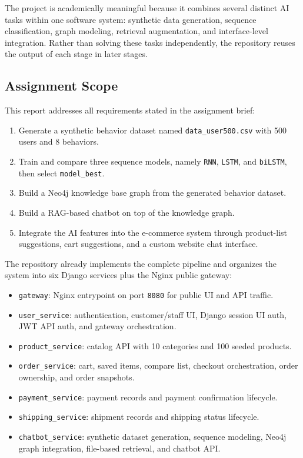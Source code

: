 \documentclass[12pt,a4paper]{article}
\begin{document}
The project is academically meaningful because it combines several distinct AI tasks within one software system: synthetic data generation, sequence classification, graph modeling, retrieval augmentation, and interface-level integration. Rather than solving these tasks independently, the repository reuses the output of each stage in later stages.

\subsection{Assignment Scope}
This report addresses all requirements stated in the assignment brief:
\begin{enumerate}[label=\arabic*.]
  \item Generate a synthetic behavior dataset named \texttt{data\_user500.csv} with 500 users and 8 behaviors.
  \item Train and compare three sequence models, namely \texttt{RNN}, \texttt{LSTM}, and \texttt{biLSTM}, then select \texttt{model\_best}.
  \item Build a Neo4j knowledge base graph from the generated behavior dataset.
  \item Build a RAG-based chatbot on top of the knowledge graph.
  \item Integrate the AI features into the e-commerce system through product-list suggestions, cart suggestions, and a custom website chat interface.
\end{enumerate}

The repository already implements the complete pipeline and organizes the system into six Django services plus the Nginx public gateway:
\begin{itemize}
  \item \texttt{gateway}: Nginx entrypoint on port \texttt{8080} for public UI and API traffic.
  \item \texttt{user\_service}: authentication, customer/staff UI, Django session UI auth, JWT API auth, and gateway orchestration.
  \item \texttt{product\_service}: catalog API with 10 categories and 100 seeded products.
  \item \texttt{order\_service}: cart, saved items, compare list, checkout orchestration, order ownership, and order snapshots.
  \item \texttt{payment\_service}: payment records and payment confirmation lifecycle.
  \item \texttt{shipping\_service}: shipment records and shipping status lifecycle.
  \item \texttt{chatbot\_service}: synthetic dataset generation, sequence modeling, Neo4j graph integration, file-based retrieval, and chatbot API.
\end{itemize}
\end{document}
